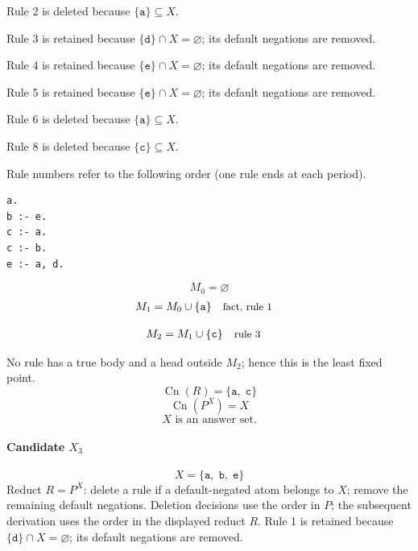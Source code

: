 \documentclass[a4paper,11pt]{article}
\newif\ifexplain
\newcommand{\explain}[1]{\ifexplain\begin{erklbox}#1\end{erklbox}\fi}
\newcommand{\why}[1]{\text{\small #1}}
\newcommand{\at}[1]{\texttt{#1}}
\begin{document}
Rule 2 is deleted because $\{\at{a}\}\subseteq X$.

Rule 3 is retained because $\{\at{d}\}\cap X=\varnothing$; its default negations are removed.

Rule 4 is retained because $\{\at{e}\}\cap X=\varnothing$; its default negations are removed.

Rule 5 is retained because $\{\at{e}\}\cap X=\varnothing$; its default negations are removed.

Rule 6 is deleted because $\{\at{a}\}\subseteq X$.

Rule 8 is deleted because $\{\at{c}\}\subseteq X$.

Rule numbers refer to the following order (one rule ends at each period).
\begin{small}
\begin{verbatim}
a.
b :- e.
c :- a.
c :- b.
e :- a, d.
\end{verbatim}
\end{small}
\explain{Beim Redukt bleibt die Kandidatenmenge fest. Wir entscheiden zuerst, welche Regeln wegfallen. Erst danach berechnen wir aus den verbleibenden positiven Regeln die kleinste abgeschlossene Menge. Ein Modell allein reicht nicht: Diese Menge muss genau der Kandidat sein.}
\[
M_0=\varnothing
\]
\begin{align*}
M_{1} &= M_{0}\cup \{\at{a}\} && \why{fact, rule 1}
\end{align*}
\explain{Diese Regel hat keinen Körper. Ihr Kopf $\at{a}$ ist damit ein Fakt und muss in die Menge.}
\begin{align*}
M_{2} &= M_{1}\cup \{\at{c}\} && \why{rule 3}
\end{align*}
\explain{Für $\at{c}$ brauchen wir $\at{a}$. Weil diese Voraussetzungen bereits hergeleitet sind, dürfen wir den Regelkopf jetzt aufnehmen und alle bisherigen Atome behalten; bei einer fehlenden Voraussetzung würde diese Regel dagegen noch nichts beitragen.}
No rule has a true body and a head outside $M_{2}$; hence this is the least fixed point.
\[
\operatorname{Cn}(R)=\{\at{a},\;\at{c}\}
\]
\[
\operatorname{Cn}(P^X)=X
\]
\[
\boxed{X\text{ is an answer set.}}
\]
\paragraph{Candidate $X_3$}
\[
X=\{\at{a},\;\at{b},\;\at{e}\}
\]
Reduct $R=P^X$: delete a rule if a default-negated atom belongs to $X$; remove the remaining default negations. Deletion decisions use the order in $P$; the subsequent derivation uses the order in the displayed reduct $R$.
Rule 1 is retained because $\{\at{d}\}\cap X=\varnothing$; its default negations are removed.
\end{document}
